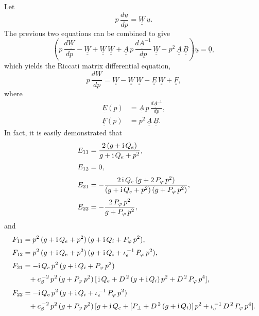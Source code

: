 \documentclass[12pt,prb,aps]{revtex4-1}
\begin{document}
Let
\begin{equation}\label{wdef}
 p\,\frac{d\underline{u}}{dp}=\underline{\underline{W}}\,\underline{u}.
\end{equation}
The previous two equations can be combined to give 
\begin{equation}
\left(p\,\frac{d\underline{\underline{W}}}{dp} - \underline{\underline{W}} 
+ \underline{\underline{W}}\,\underline{\underline{W}} + \underline{\underline{A}}\,p\,\frac{d\underline{\underline{A}}^{-1}}{dp}\,\underline{\underline{W}}- p^2\,\underline{\underline{A}}\,\underline{\underline{B}}\right)\underline{u} = \underline{0},
\end{equation}
which  yields the Riccati matrix differential equation, 
\begin{equation}\label{ricc}
p\,\frac{d\underline{\underline{W}}}{dp} = \underline{\underline{W}} - \underline{\underline{W}}\,\underline{\underline{W}} - \underline{\underline{E}}\,\underline{\underline{W}}
+\underline{\underline{F}},
\end{equation}
where 
\begin{align}
\underline{\underline{E}}(p) &= 
\underline{\underline{A}}\,p\,\frac{d\underline{\underline{A}}^{-1}}{dp},\\[0.5ex]
\underline{\underline{F}}(p)&= p^2\,\underline{\underline{A}}\,\underline{\underline{B}}.
\end{align}
In fact, it is easily demonstrated that
\begin{align}\label{ee1}
E_{11} &= \frac{2\,(g+{\rm i}\,Q_e)}{g+ {\rm i}\,Q_e+p^2},\\[0.5ex]
E_{12}&= 0,\\[0.5ex]
E_{21} &=-\frac{2\,{\rm i}\,Q_e\,(g+2\,P_\varphi\,p^2)}{(g+{\rm i}\,Q_e+p^2)\,(g+P_\varphi\,p^2)},\\[0.5ex]
E_{22} &= -\frac{2\,P_\varphi\,p^2}{g+ P_\varphi\,p^2},\label{ee4}
\end{align}
and
\begin{align}\label{f1}
F_{11} &= p^2\,(g+{\rm i}\,Q_e+p^2)\,(g+{\rm i}\,Q_i + P_\varphi\,p^2),\\[0.5ex]
F_{12} &= p^2\,(g+{\rm i}\,Q_e+p^2)\,(g+{\rm i}\,Q_i + \iota_e^{\,-1}\,P_\varphi\,p^2),\\[0.5ex]
F_{21} &=-{\rm i}\,Q_e\,p^2\,(g+{\rm i}\,Q_i+P_\varphi\,p^2)\nonumber\\[0.5ex]
&\phantom{=} + c_\beta^{\,-2}\,p^2\,(g+P_\varphi\,p^2)\,[\,{\rm i}\,Q_e+ D^{\,2}\,(g+{\rm i}\,Q_i)\,p^2 + D^{\,2}\,P_\varphi\,p^4],\\[0.5ex]
F_{22} &=-{\rm i}\,Q_e\,p^2\,(g+{\rm i}\,Q_i+\iota_e^{\,-1}\,P_\varphi\,p^2)\nonumber\\[0.5ex] 
&\phantom{=}+c_\beta^{\,-2}\,p^2\,(g+P_\varphi\,p^2)\,[g+{\rm i}\,Q_e + [P_\perp +D^{\,2}\,(g + {\rm i}\,Q_i)]\,p^2 + \iota_e^{\,-1}\,D^{\,2}\,P_\varphi\,p^4].\label{f4}
\end{align}
\end{document}

